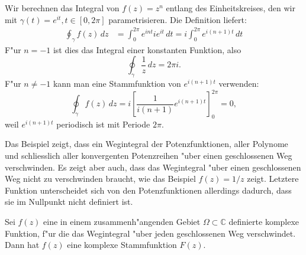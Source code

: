 \begin{beispiel}
Wir berechnen das Integral von $f(z)=z^n$ entlang des Einheitskreises,
den wir mit $\gamma(t)=e^{it},t\in[0,2\pi]$ parametrisieren.
Die Definition liefert:
\begin{align*}
\oint_{\gamma}f(z)\,dz
&=
\int_0^{2\pi}e^{int}ie^{it}\,dt
=
i\int_0^{2\pi}e^{i(n+1)t}\,dt
\end{align*}
F"ur $n=-1$ ist dies das Integral einer konstanten Funktion, also
\[
\oint_{\gamma}\frac1z\,dz=2\pi i.
\]
F"ur $n\ne -1$ kann man eine Stammfunktion von $e^{i(n+1)t}$
verwenden:
\[
\oint_{\gamma}f(z)\,dz
=
i\left[\frac1{i(n+1)}e^{i(n+1)t}\right]_0^{2\pi}
=0,
\]
weil $e^{i(n+1)t}$ periodisch ist mit Periode $2\pi$.
\end{beispiel}
Das Beispiel zeigt, dass ein Wegintegral der Potenzfunktionen,
aller Polynome und schliesslich aller konvergenten Potenzreihen
"uber einen geschlossenen Weg verschwinden.
Es zeigt aber auch, dass das Wegintegral "uber einen geschlossenen
Weg nicht zu verschwinden braucht, wie das Beispiel $f(z)=1/z$ 
zeigt.
Letztere Funktion unterscheidet sich von den Potenzfunktionen allerdings
dadurch, dass sie im Nullpunkt nicht definiert ist.

\begin{satz}
Sei $f(z)$ eine in einem zusammenh"angenden Gebiet $\Omega\subset\mathbb C$
definierte komplexe Funktion, f"ur die das Wegintegral "uber jeden
geschlossenen Weg verschwindet.
Dann hat $f(z)$ eine komplexe Stammfunktion $F(z)$.
\end{satz}

